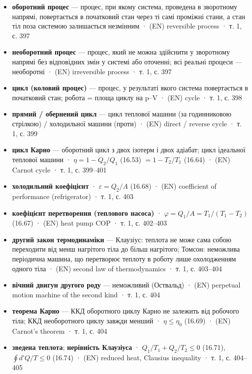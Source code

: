 \documentclass[11pt,a4paper,oneside]{book}
\newcommand{\book}{}
\begin{document}
\begin{itemize}
\item \textbf{оборотний процес} — процес, при якому система, проведена в зворотному напрямі, повертається в початковий стан через ті самі проміжні стани, а стан тіл поза системою залишається незмінним · (EN) reversible process · \book{} т. 1, с. 397
\item \textbf{необоротний процес} — процес, який не можна здійснити у зворотному напрямі без відповідних змін у системі або оточенні; всі реальні процеси — необоротні · (EN) irreversible process · \book{} т. 1, с. 397
\item \textbf{цикл (коловий процес)} — процес, у результаті якого система повертається в початковий стан; робота = площа циклу на p–V · (EN) cycle · \book{} т. 1, с. 398
\item \textbf{прямий / обернений цикл} — цикл теплової машини (за годинниковою стрілкою) / холодильної машини (проти) · (EN) direct / reverse cycle · \book{} т. 1, с. 399
\item \textbf{цикл Карно} — оборотний цикл з двох ізотерм і двох адіабат; цикл ідеальної теплової машини · $\eta = 1 - Q_2/Q_1$ (16.53) $= 1 - T_2/T_1$ (16.64) · (EN) Carnot cycle · \book{} т. 1, с. 399–401
\item \textbf{холодильний коефіцієнт} · $\varepsilon = Q_2/A$ (16.68) · (EN) coefficient of performance (refrigerator) · \book{} т. 1, с. 403
\item \textbf{коефіцієнт перетворення (теплового насоса)} · $\varphi = Q_1/A = T_1/(T_1-T_2)$ (16.67) · (EN) heat pump COP · \book{} т. 1, с. 402–403
\item \textbf{другий закон термодинаміки} — Клаузіус: теплота не може сама собою переходити від менш нагрітого тіла до більш нагрітого; Томсон: неможлива періодична машина, що перетворює теплоту в роботу лише охолодженням одного тіла · (EN) second law of thermodynamics · \book{} т. 1, с. 403–404
\item \textbf{вічний двигун другого роду} — неможливий (Оствальд) · (EN) perpetual motion machine of the second kind · \book{} т. 1, с. 404
\item \textbf{теорема Карно} — ККД оборотного циклу Карно не залежить від робочого тіла; ККД необоротного циклу завжди менший · $\eta \le \eta_0$ (16.69) · (EN) Carnot's theorem · \book{} т. 1, с. 404
\item \textbf{зведена теплота}; \textbf{нерівність Клаузіуса} · $Q_1/T_1 + Q_2/T_2 \le 0$ (16.71), $\oint d\text{'}Q/T \le 0$ (16.74) · (EN) reduced heat, Clausius inequality · \book{} т. 1, с. 404–405

\end{itemize}
\end{document}
